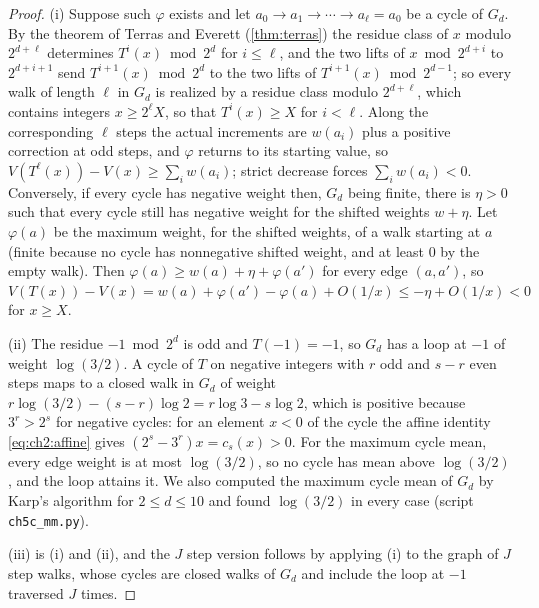 \begin{proof}
(i) Suppose such $\varphi$ exists and let $a_0\to a_1\to\cdots\to a_\ell=a_0$
be a cycle of $G_d$. By the theorem of Terras and
Everett (\cref{thm:terras}) the residue class of $x$ modulo
$2^{d+\ell}$ determines $T^i(x)\bmod2^d$ for $i\le\ell$, and the two lifts of
$x\bmod2^{d+i}$ to $2^{d+i+1}$ send $T^{i+1}(x)\bmod2^d$ to the two lifts of
$T^{i+1}(x)\bmod2^{d-1}$; so every walk of length $\ell$ in $G_d$ is realized
by a residue class modulo $2^{d+\ell}$, which contains integers $x\ge2^\ell X$, so that $T^i(x)\ge X$ for $i<\ell$. Along
the corresponding $\ell$ steps the actual increments are $w(a_i)$ plus a
positive correction at odd steps, and $\varphi$ returns to its starting value,
so $V(T^\ell(x))-V(x)\ge\sum_iw(a_i)$; strict decrease forces
$\sum_iw(a_i)<0$. Conversely, if every cycle has negative weight then, $G_d$
being finite, there is $\eta>0$ such that every cycle still has negative weight
for the shifted weights $w+\eta$. Let $\varphi(a)$ be the maximum weight, for
the shifted weights, of a walk starting at $a$ (finite because no cycle has
nonnegative shifted weight, and at least $0$ by the empty walk). Then
$\varphi(a)\ge w(a)+\eta+\varphi(a')$ for every edge $(a,a')$, so
$V(T(x))-V(x)=w(a)+\varphi(a')-\varphi(a)+O(1/x)\le-\eta+O(1/x)<0$ for $x\ge X$.

(ii) The residue $-1\bmod2^d$ is odd and $T(-1)=-1$, so $G_d$ has a loop at
$-1$ of weight $\log(3/2)$. A cycle of $T$ on negative integers with $r$ odd and
$s-r$ even steps maps to a closed walk in $G_d$ of weight
$r\log(3/2)-(s-r)\log2=r\log3-s\log2$, which is positive because $3^r>2^s$ for negative cycles: for an element $x<0$ of the
cycle the affine identity \eqref{eq:ch2:affine} gives $(2^s-3^r)x=c_s(x)>0$. For
the maximum cycle mean, every edge weight is at most $\log(3/2)$, so no cycle
has mean above $\log(3/2)$, and the loop attains it. We also computed the
maximum cycle mean of $G_d$ by Karp's algorithm for $2\le d\le10$ and found
$\log(3/2)$ in every case (script \texttt{ch5c\_mm.py}).

(iii) is (i) and (ii), and the $J$ step version follows by applying (i) to the
graph of $J$ step walks, whose cycles are closed walks of $G_d$ and include the loop at $-1$ traversed $J$ times.
\end{proof}

